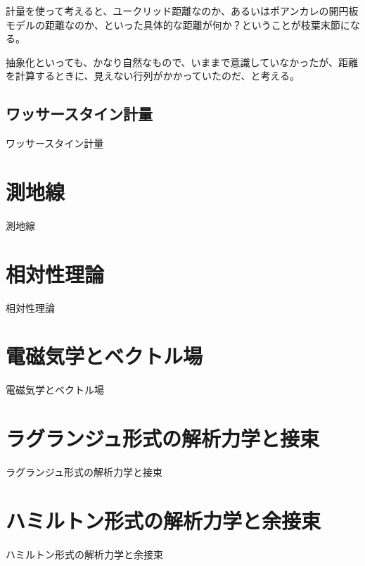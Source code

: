 計量を使って考えると、ユークリッド距離なのか、あるいはポアンカレの開円板モデルの距離なのか、といった具体的な距離が何か？ということが枝葉末節になる。

抽象化といっても、かなり自然なもので、いままで意識していなかったが、距離を計算するときに、見えない行列がかかっていたのだ、と考える。

\newpage


\subsection{ ワッサースタイン計量 }

ワッサースタイン計量

\newpage


\section{ 測地線 }

測地線

\newpage


\section{ 相対性理論 }

相対性理論

\newpage


\section{ 電磁気学とベクトル場 }

電磁気学とベクトル場

\newpage


\section{ ラグランジュ形式の解析力学と接束 }

ラグランジュ形式の解析力学と接束

\newpage


\section{ ハミルトン形式の解析力学と余接束 }

ハミルトン形式の解析力学と余接束

\newpage
